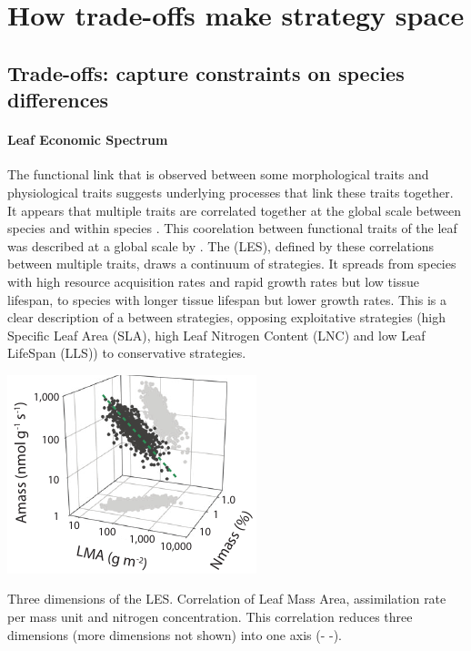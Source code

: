 \section{How trade-offs make strategy space}

\subsection{Trade-offs: capture constraints on species differences}

\paragraph{Leaf Economic Spectrum}
The functional link that is observed between some morphological traits and physiological traits suggests underlying processes that link these traits together. It appears that multiple traits are correlated together at the global scale between species \parencite{reich_evolution_2003,	 wright_worldwide_2004, chave_towards_2009, reich_world-wide_2014} and within species \parencite{hu_novel_2015}. This coorelation between functional traits of the leaf was described at a global scale by \cite{wright_worldwide_2004}. The  (LES), defined by these correlations between multiple traits, draws a continuum of strategies. It spreads from species with high resource acquisition rates and rapid growth rates but low tissue lifespan, to species with longer tissue lifespan but lower growth rates. This is a clear description of a  between strategies, opposing exploitative strategies (high Specific Leaf Area (SLA), high Leaf Nitrogen Content (LNC) and low Leaf LifeSpan (LLS)) to conservative strategies.


\begin{marginfigure}
    \includegraphics{./Figures/LES1_m.pdf}
  \caption[Leaf Economic Spectrum]{Three dimensions of the LES. Correlation of Leaf Mass Area, assimilation rate per mass unit and nitrogen concentration. This correlation reduces three dimensions (more dimensions not shown) into one axis (\textcolor{myGreen}{- -}).}
  \label{fg:insurance}
\end{marginfigure}

